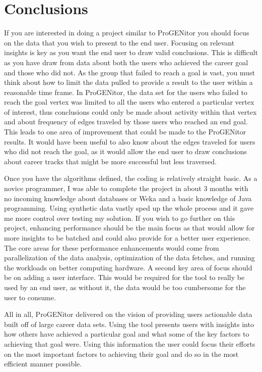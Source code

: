 \section{Conclusions}
\label{sect:conclusions}
If you are interested in doing a project similar to ProGENitor you should focus
on the data that you wish to present to the end user.  Focusing on relevant
insights is key as you want the end user to draw valid conclusions.  This is
difficult as you have draw from data about both the users who achieved the
career goal and those who did not.  As the group that failed to reach a goal is
vast, you must think about how to limit the data pulled to provide a result to
the user within a reasonable time frame.  In ProGENitor, the data set for the
users who failed to reach the goal vertex was limited to all the users who entered
a particular vertex of interest, thus conclusions could only be made about
activity within that vertex and about frequency of edges traveled by those users
who reached an end goal.  This leads to one area of improvement that could be
made to the ProGENitor results.  It would have been useful to also know about
the edges traveled for users who did not reach the goal, as it would allow the
end user to draw conclusions about career tracks that might be more successful
but less traversed.

Once you have the algorithms defined, the coding is relatively straight
basic.  As a novice programmer, I was able to complete the project in about 3
months with no incoming knowledge about databases or Weka and a basic knowledge
of Java programming.  Using synthetic data vastly sped up the whole process and
it gave me more control over testing my solution.  If you wish to go further on
this project, enhancing performance should be the main focus as that would allow
for more insights to be batched and could also provide for a better user
experience.  The core areas for these performance enhancements would come from
parallelization of the data analysis, optimization of the data fetches, and
running the workloads on better computing hardware.  A second key area of focus
should be on adding a user interface.  This would be required for the tool to
really be used by an end user, as without it, the data would be too cumbersome
for the user to consume.

All in all, ProGENitor delivered on the vision of providing users actionable
data built off of large career data sets.  Using the tool presents users with
insights into how others have achieved a particular goal and what some of the
key factors to achieving that goal were.  Using this information the user could
focus their efforts on the most important factors to achieving their goal and do
so in the most efficient manner possible.
